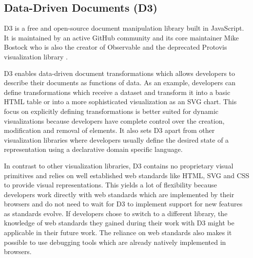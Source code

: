 \subsection{Data-Driven Documents (D3)}

D3 \parencite{D3} is a free and open-source document manipulation library built in JavaScript. It is maintained by an active GitHub community and its core maintainer Mike Bostock who is also the creator of Observable \parencite{Observable} and the deprecated Protovis visualization library \parencite{Protovis}.

D3 enables data-driven document transformations which allows developers to describe their documents as functions of data. As an example, developers can define transformations which receive a dataset and transform it into a basic HTML table or into a more sophisticated visualization as an SVG chart. This focus on explicitly defining transformations is better suited for dynamic visualizations because developers have complete control over the creation, modification and removal of elements. It also sets D3 apart from other visualization libraries where developers usually define the desired state of a representation using a declarative domain specific language.

In contrast to other visualization libraries, D3 contains no proprietary visual primitives and relies on well established web standards like HTML, SVG and CSS to provide visual representations. This yields a lot of flexibility because developers work directly with web standards which are implemented by their browsers and do not need to wait for D3 to implement support for new features as standards evolve. If developers chose to switch to a different library, the knowledge of web standards they gained during their work with D3 might be applicable in their future work. The reliance on web standards also makes it possible to use debugging tools which are already natively implemented in browsers.

